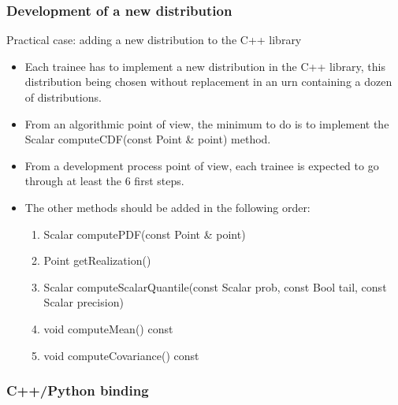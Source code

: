 \documentclass[8pt]{beamer}
\begin{document}
\begin{frame}
  \frametitle{Development of a new distribution}
  \begin{block}{Practical case: adding a new distribution to the C++ library}
    \begin{itemize}
    \item Each trainee has to implement a new distribution in the C++ library, this distribution being chosen without replacement in an urn containing a dozen of distributions.
    \item From an algorithmic point of view, the minimum to do is to implement the {\ttfamily Scalar computeCDF(const Point \& point)} method.
    \item From a development process point of view, each trainee is expected to go through at least the 6 first steps.
    \item The other methods should be added in the following order:
      \begin{enumerate}
      \item {\ttfamily Scalar computePDF(const Point \& point)}
      \item {\ttfamily Point getRealization()}
      \item {\ttfamily Scalar computeScalarQuantile(const Scalar prob, const Bool tail, const Scalar precision)}
      \item {\ttfamily void computeMean() const}
      \item {\ttfamily void computeCovariance() const}
      \end{enumerate}
    \end{itemize}
  \end{block}
\end{frame}


\begin{frame}
  \frametitle{C++/Python binding}
  \tableofcontents[part=1]
\end{frame}
\end{document}
